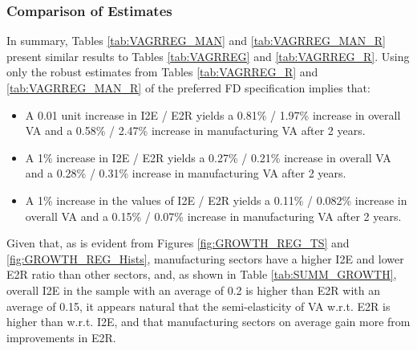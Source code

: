 \documentclass[a4paper]{article}
\begin{document}

\subsubsection{Comparison of Estimates}
In summary, Tables \ref{tab:VAGRREG_MAN} and \ref{tab:VAGRREG_MAN_R} present similar results to Tables \ref{tab:VAGRREG} and \ref{tab:VAGRREG_R}. Using only the robust estimates from Tables \ref{tab:VAGRREG_R} and \ref{tab:VAGRREG_MAN_R} of the preferred FD specification implies that:
\begin{itemize}
\item A 0.01 unit increase in I2E / E2R yields a 0.81\% / 1.97\% increase in overall VA and a 0.58\% / 2.47\% increase in manufacturing VA after 2 years.
\item A 1\% increase in I2E / E2R yields a 0.27\% / 0.21\% increase in overall VA and a 0.28\% / 0.31\% increase in manufacturing VA after 2 years.
\item A 1\% increase in the values of I2E / E2R yields a 0.11\% / 0.082\% increase in overall VA and a 0.15\% / 0.07\% increase in manufacturing VA after 2 years.
\end{itemize}

Given that, as is evident from Figures \ref{fig:GROWTH_REG_TS} and \ref{fig:GROWTH_REG_Hists}, manufacturing sectors have a higher I2E and lower E2R ratio than other sectors, and, as shown in Table \ref{tab:SUMM_GROWTH}, overall I2E in the sample with an average of 0.2 is higher than E2R with an average of 0.15, it appears natural that the semi-elasticity of VA w.r.t. E2R is higher than w.r.t. I2E, and that manufacturing sectors on average gain more from improvements in E2R. 
\end{document}
